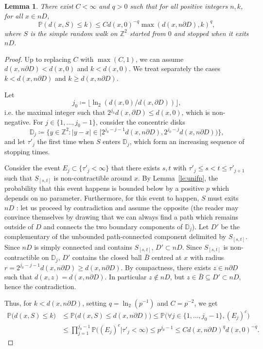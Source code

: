 \documentclass[11pt]{article}
\newtheorem{lemma}[theorem]{Lemma}
\begin{document}
\begin{lemma}
    \label{le:probbound1}
    There exist $C<\infty$ and $q>0$ such that for all positive integers $n,k$, for all $x\in n D$,
    \[ \mathbb{P}( d(x,S) \leq k)\leq C  d(x,0)^{-q} \max(d(x,n \partial  D), k)^q,
    \]
    where $S$ is the simple random walk on $\mathbb{Z}^2$ started from $0$ and stopped when it exits $n D$.
\end{lemma}
\begin{proof}
    Up to replacing $C$ with $\max(C,1 )$, we can assume $d(x,n \partial D)<d(x,0)$ and $k<d(x,0)$. We treat separately the cases $k< d(x,n \partial D)$ and $k\geq d(x,n \partial D)$.

    Let \[j_0\coloneqq \lfloor \ln_2(d(x,0)/d(x,\partial D))\rfloor,\] i.e. the maximal integer such that $2^{j_0}d(x,\partial D) \leq d(x,0) $, which is non-negative. For $j\in \{1,\dots, j_0-1\}$, consider the concentric disks \[ \mathbb{D}_j\coloneqq \{ y\in \mathbb{Z}^2 : |y-x|\in [  2^{j_0-j-1}d(x,n \partial D),  2^{j_0-j} d(x,n \partial D) )  \}, \]
    and let $\tau'_j$ the first time when $S$ enters $\mathbb{D}_j$, which form an increasing sequence of stopping times.

    Consider the event $E_j\subset\{\tau'_j<\infty\}$ that there exists $s,t$ with $\tau'_j\leq s <t\leq \tau'_{j+1}$ such that $S_{[s,t]}$ is non-contractible around $x$. By Lemma~\ref{le:unifp}, the probability that this event happens is bounded below by a positive $p$ which depends on no parameter. Furthermore, for this event to happen, $S$ must exits $nD$ : let us proceed by contradiction and assume the opposite (the reader may convince themselves by drawing that we can always find a path which remains outside of $D$ and connects the two boundary components of $\mathbb{D}_j$).  Let $D'$ be the complementary of the unbounded path-connected component delimited by $S_{[s,t]}$. Since $nD$ is simply connected and contains $S_{[s,t]}$, $D'\subset nD$. Since $S_{[s,t]}$ is non-contractible on $\mathbb{D}_j$, $D'$ contains the closed ball $\bar{B}$ centred at $x$ with radius $r=2^{j_0-j-1}d(x,n\partial D)\geq d(x,n \partial D)$. By compactness, there exists $z \in n \partial D$ such that $d(x,z)=d(x,n \partial D)$. In particular $z\notin n D$, but $z\in \bar{B}\subseteq D'\subset nD$, hence the contradiction.

    Thus, for $k< d(x,n \partial D)$, setting  $q= \ln_2 (p^{-1})$ and $C=p^{-2}$, we get
    \begin{align*}
    \mathbb{P}\big( d(x, S)\leq  k\big)&\leq
    \mathbb{P}\big( d(x,S)\leq  d(x,n \partial D)\big)
    \leq \mathbb{P} \big( \forall j\in \{1,\dots, j_0-1\} , (E_j)^c \big)\\
    &\leq \prod_{j=1}^{j_0-1} \mathbb{P} \big(  (E_j)^c\big|  \tau'_j<\infty \big) \leq p^{j_0-1}
    \leq C d(x,n \partial D)^q  d(x, 0)^{-q}.
    \end{align*}


\end{proof}
\end{document}
